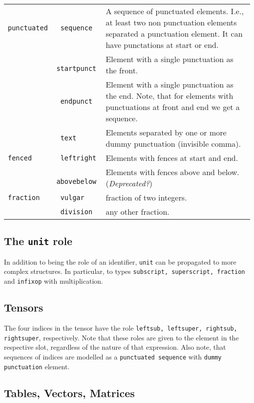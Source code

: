 \documentclass{article}
\def\depr#1{#1 (\textit{Deprecated?})}
\begin{document}
\begin{tabular}{>{\tt}l>{\tt}lp{11cm}}
  punctuated & sequence & A sequence of punctuated elements. I.e., at least two non punctuation elements
                          separated a punctuation element. It can have punctations at start or end.\\
             & startpunct & Element with a single punctuation as the front.\\
             & endpunct & Element with a single punctuation as the end. Note, that for elements with
                          punctuations at front and end we get a sequence.\\
             & text & Elements separated by one or more dummy punctuation (invisible comma).\\
  fenced & leftright & Elements with fences at start and end.\\
             & abovebelow & \depr{Elements with fences above and below.} \\
  fraction & vulgar & fraction of two integers.\\
             & division & any other fraction.\\
\end{tabular}

\subsection{The \texttt{unit} role}

In addition to being the role of an identifier, \texttt{unit} can be propagated
to more complex structures. In particular, to types \texttt{subscript,
  superscript, fraction} and \texttt{infixop} with multiplication.

\subsection{Tensors}

The four indices in the tensor have the role \texttt{leftsub, leftsuper,
  rightsub, rightsuper}, respectively. Note that these roles are given to the
element in the respective slot, regardless of the nature of that expression.
Also note, that sequences of indices are modelled as a \texttt{punctuated
  sequence} with \texttt{dummy punctuation} element.


\subsection{Tables, Vectors, Matrices}
\end{document}
